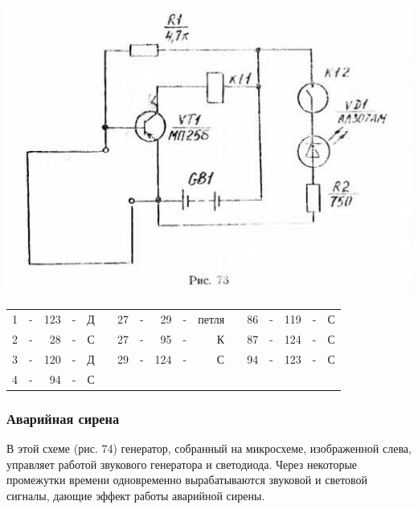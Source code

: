 \documentclass[12pt]{article}
\begin{document}
\vspace{1.5cm}

\includegraphics[scale=1, angle=0]{ekon3_074_1}

\vspace{1.5cm}

\hrulefill

\begin{tabular}{r c r c r p{2cm} r c r c r p{2cm} r c r c r}
 1 & - & 123 & - & Д &     &  27 & - &  29 & - & петля &    &  86 & - & 119 & - & С\\
 2 & - &  28 & - & С &     &  27 & - &  95 & - & К     &    &  87 & - & 124 & - & С\\
 3 & - & 120 & - & Д &     &  29 & - & 124 & - & С     &    &  94 & - & 123 & - & С\\
 4 & - &  94 & - & С &     &     &   &     &   &       &    &     &   &     &   &  \\
\end{tabular}

\hrulefill

\newpage

\subsubsection{Аварийная сирена}

В этой схеме (рис. 74) генератор, собранный на микросхеме, изображенной слева, управляет работой звукового генератора и светодиода. Через некоторые промежутки времени одновременно вырабатываются звуковой и световой сигналы, дающие эффект работы аварийной сирены.

\vspace{1.5cm}
\end{document}
